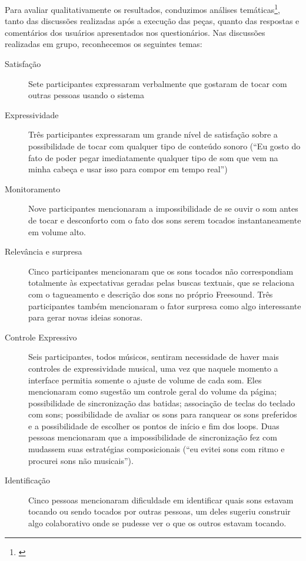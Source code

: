 Para avaliar qualitativamente os resultados, conduzimos análises temáticas\footnote{\cite{Braun2006}}, tanto das discussões realizadas após a execução das peças, quanto das respostas e comentários dos usuários apresentados nos questionários. Nas discussões realizadas em grupo, reconhecemos os seguintes temas:

\begin{description}
 \item[Satisfação] Sete participantes expressaram verbalmente que gostaram de tocar com outras pessoas usando o sistema

  \item[Expressividade] Três participantes expressaram um grande nível de satisfação sobre a possibilidade de tocar com qualquer tipo de conteúdo sonoro (``Eu gosto do fato de poder pegar imediatamente qualquer tipo de som que vem na minha cabeça e usar isso para compor em tempo real'')

 \item[Monitoramento] Nove participantes mencionaram a impossibilidade de se ouvir o som antes de tocar e desconforto com o fato dos sons serem tocados instantaneamente em volume alto. 

 \item[Relevância e surpresa] Cinco participantes mencionaram que os sons tocados não correspondiam totalmente às expectativas geradas pelas buscas textuais, que se relaciona com o tagueamento e descrição dos sons no próprio Freesound. Três participantes também mencionaram o fator surpresa como algo interessante para gerar novas ideias sonoras.

 \item[Controle Expressivo] Seis participantes, todos músicos, sentiram necessidade de haver mais controles de expressividade musical, uma vez que naquele momento a interface permitia somente o ajuste de volume de cada som. Eles mencionaram como sugestão um controle geral do volume da página; possibilidade de sincronização das batidas; associação de teclas do teclado com sons; possibilidade de avaliar os sons para ranquear os sons preferidos e a possibilidade de escolher os pontos de início e fim dos loops. Duas pessoas mencionaram que a impossibilidade de sincronização fez com mudassem suas estratégias composicionais (``eu evitei sons com ritmo e procurei sons não musicais'').

  \item[Identificação] Cinco pessoas mencionaram dificuldade em identificar quais sons estavam tocando ou sendo tocados por outras pessoas, um deles sugeriu construir algo colaborativo onde se pudesse ver o que os outros estavam tocando.


\end{description}
